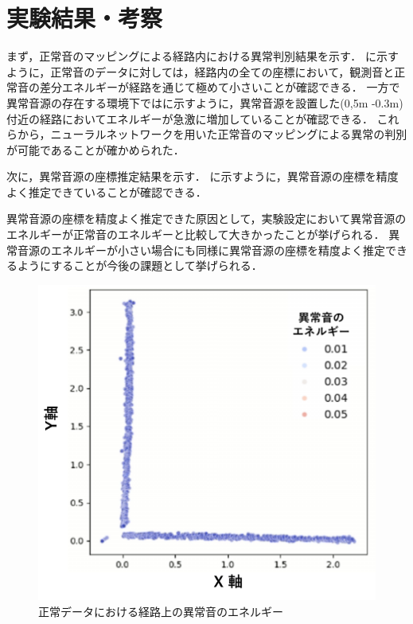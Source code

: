 \documentclass[../main]{subfiles}
\begin{document}
\graphicspath{{../figures}}

\section{実験結果・考察}
まず，正常音のマッピングによる経路内における異常判別結果を示す．
に示すように，正常音のデータに対しては，経路内の全ての座標において，観測音と正常音の差分エネルギーが経路を通じて極めて小さいことが確認できる．
一方で異常音源の存在する環境下ではに示すように，異常音源を設置した(0,5m -0.3m)付近の経路においてエネルギーが急激に増加していることが確認できる．
これらから，ニューラルネットワークを用いた正常音のマッピングによる異常の判別が可能であることが確かめられた．

次に，異常音源の座標推定結果を示す．
に示すように，異常音源の座標を精度よく推定できていることが確認できる．

異常音源の座標を精度よく推定できた原因として，実験設定において異常音源のエネルギーが正常音のエネルギーと比較して大きかったことが挙げられる．
異常音源のエネルギーが小さい場合にも同様に異常音源の座標を精度よく推定できるようにすることが今後の課題として挙げられる．

\begin{figure}[tb]
  \centering
  \includegraphics[keepaspectratio, width=0.8\linewidth]{energy_normal.pdf}
  \caption{正常データにおける経路上の異常音のエネルギー}
\end{figure}
\end{document}
